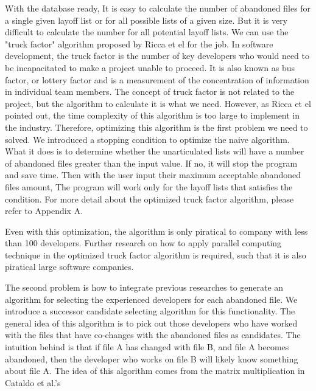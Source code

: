 \documentclass[12pt, a4paper, openright]{report}
\begin{document}
With the database ready, It is easy to calculate the number of abandoned files for a single given layoff list or for all possible lists of a given size. But it is very difficult to calculate the number for all potential layoff lists. 
We can use the "truck factor" algorithm proposed by Ricca et el \cite{Ricca2011PROFES} for the job. In software development, the truck factor is the number of key developers who would need to be incapacitated to make a project unable to proceed. It is also known as bus factor, or lottery factor and is a measurement of the concentration of information in individual team members. The concept of truck factor is not related to the project, but the algorithm to calculate it is what we need. However, as Ricca et el pointed out\cite{Ricca2011PROFES}, the time complexity of this algorithm is too large to implement in the industry. Therefore, optimizing this algorithm is the first problem we need to solved. We introduced a stopping condition to optimize the naive algorithm. What it does is to determine whether the unarticulated lists will have a number of abandoned files greater than the input value. If no, it will stop the program and save time. Then with the user input their maximum acceptable abandoned files amount, The program will work only for the layoff lists that satisfies the condition. For more detail about the optimized truck factor algorithm, please refer to Appendix A.  


Even with this optimization, the algorithm is only piratical to company with less than 100 developers. Further research on how to apply parallel computing technique in the optimized truck factor algorithm is required, such that it is also piratical large software companies.


The second problem is how to integrate previous researches to generate an algorithm for selecting the experienced developers for each abandoned file. We introduce a successor candidate selecting algorithm for this functionality. The general idea of this algorithm is to pick out those developers who have worked with the files that have co-changes with the abandoned files as candidates. The intuition behind is that if file A has changed with file B, and file A becomes abandoned, then the developer who works on file B will likely know something about file A. The idea of this algorithm comes from the matrix multiplication in Cataldo et al.'s\cite{Cataldo2006CSCW}
\end{document}
